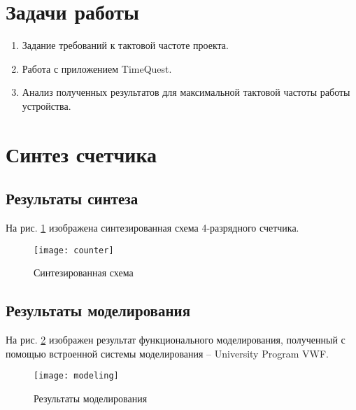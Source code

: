 





\tableofcontents
\listoffigures
\lstlistoflistings
\newpage

\section{Задачи работы}

\begin{enumerate}
\setlength\itemsep{0em}
\item Задание требований к тактовой частоте проекта.
\item Работа с приложением TimeQuest.
\item Анализ полученных результатов для максимальной тактовой частоты работы устройства.
\end{enumerate}

\section{Синтез счетчика}

\subsection{Результаты синтеза}

На рис. \ref{fig:counter} изображена синтезированная схема 4-разрядного счетчика.

\begin{figure}[H]
\begin{center}
	\texttt{[image: counter]}
	\caption{Синтезированная схема}
	\label{fig:counter}
\end{center}
\end{figure}

\subsection{Результаты моделирования}

На рис. \ref{fig:func-modeling} изображен результат функционального моделирования, полученный с помощью встроенной системы моделирования – University Program VWF.

\begin{figure}[H]
\begin{center}
	\texttt{[image: modeling]}
	\caption{Результаты моделирования}
	\label{fig:func-modeling}
\end{center}
\end{figure}

